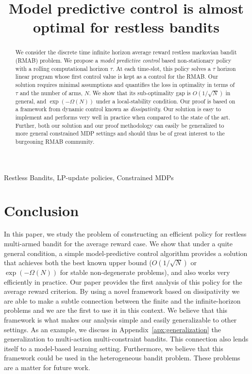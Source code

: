 \documentclass[final, 12pt]{colt2025} %
\title{Model predictive control is almost optimal for restless bandits}
\begin{document}
\maketitle

\begin{abstract}
    We consider the discrete time infinite horizon average reward restless markovian bandit (RMAB) problem. We propose a \emph{model predictive control} based non-stationary policy with a rolling computational horizon $\tau$. At each time-slot, this policy solves a $\tau$ horizon linear program whose first control value is kept as a control for the RMAB. Our solution requires minimal assumptions and quantifies the loss in optimality in terms of $\tau$ and the number of arms, $N$. We show that its sub-optimality gap is $O(1/\sqrt{N})$ in general, and $\exp(-\Omega(N))$ under a local-stability condition. Our proof is based on a framework from dynamic control known as \emph{dissipativity}. Our solution is easy to implement and performs very well in practice when compared to the state of the art. Further, both our solution and our proof methodology can easily be generalized to more general constrained MDP settings and should thus be of great interest to the burgeoning RMAB community.
\end{abstract}

\begin{keywords}%
  Restless Bandits, LP-update policies, Constrained MDPs%
\end{keywords}






\section{Conclusion}
\label{sec:conclusion}
In this paper, we study the problem of constructing an efficient policy for restless multi-armed bandit for the average reward case. We show that under a quite general condition, a simple model-predictive control algorithm provides a solution that achieves both the best known upper bound ($O(1/\sqrt{N})$ or $\exp(-\Omega(N))$ for stable non-degenerate problems), and also works very efficiently in practice. Our paper provides the first analysis of this policy for the average reward criterion. By using a novel framework based on dissipativity we are able to make a subtle connection between the finite and the infinite-horizon problems and we are the first to use it in this context. We believe that this framework is what makes our analysis simple and easily generalizable to other settings. As an example, we discuss in 
Appendix~\ref{apx:generalization}  
the generalization to multi-action multi-constraint bandits. This connection also lends itself to a model-based learning setting. Furthermore, we believe that this framework could be used in the heterogeneous bandit problem. These problems are a matter for future work. 


\newpage
\appendix

\end{document}
